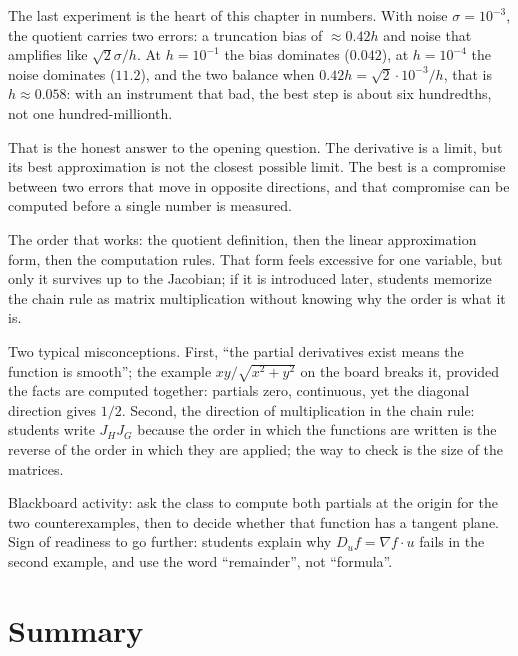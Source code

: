 The last experiment is the heart of this chapter in numbers. With noise
$\sigma=10^{-3}$, the quotient carries two errors: a truncation bias of $\approx0.42h$ and
noise that amplifies like $\sqrt{2}\sigma/h$. At $h=10^{-1}$ the bias dominates ($0.042$),
at $h=10^{-4}$ the noise dominates ($11.2$), and the two balance when
$0.42h=\sqrt{2}\cdot10^{-3}/h$, that is $h\approx0.058$: with an instrument that bad, the
best step is about six hundredths, not one hundred-millionth.

That is the honest answer to the opening question. The derivative is a limit, but its best
approximation is not the closest possible limit. The best is a compromise between two errors
that move in opposite directions, and that compromise can be computed before a single number
is measured.
\begin{untukdosen}
The order that works: the quotient definition, then the linear approximation form, then the
computation rules. That form feels excessive for one variable, but only it survives up to the
Jacobian; if it is introduced later, students memorize the chain rule as matrix multiplication
without knowing why the order is what it is.

Two typical misconceptions. First, ``the partial derivatives exist means the function is
smooth''; the example $xy/\sqrt{x^{2}+y^{2}}$ on the board breaks it, provided the facts are
computed together: partials zero, continuous, yet the diagonal direction gives $1/2$. Second,
the direction of multiplication in the chain rule: students write $J_{H}J_{G}$ because the
order in which the functions are written is the reverse of the order in which they are
applied; the way to check is the size of the matrices.

Blackboard activity: ask the class to compute both partials at the origin for the two
counterexamples, then to decide whether that function has a tangent plane. Sign of readiness
to go further: students explain why $D_{u}f=\nabla f\cdot u$ fails in the second example, and
use the word ``remainder'', not ``formula''.
\end{untukdosen}

\section{Summary}

